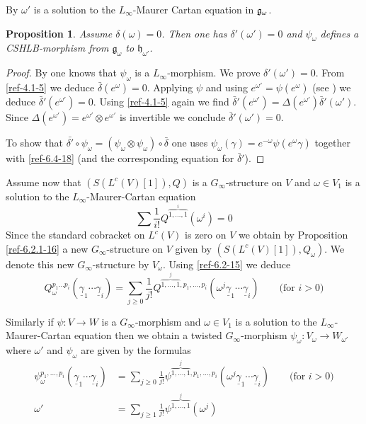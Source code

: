 \documentclass{amsart}
\numberwithin{equation}{section}
\newtheorem{propositions}[lemmas]{Proposition}
\theoremstyle{definition}
\theoremstyle{remark}
\begin{document}
By \cite{ye7} $\omega'$ is a solution to the $L_\infty$-Maurer Cartan
equation in $\frak{g}_\omega$.
\begin{propositions} Assume $\delta(\omega)=0$. Then one has
  $\delta'(\omega')=0$ and $\psi_\omega$ defines a 
  CSHLB-morphism from $\mathfrak{g}_\omega$ to
  $\mathfrak{h}_{\omega'}$.
\end{propositions}
\begin{proof} By \cite{ye7} one knows that $\psi_\omega$ is a
  $L_\infty$-morphism. We prove $\delta'(\omega')=0$.  From
  \eqref{ref-4.1-5} we deduce $\bar{\delta}(e^\omega)=0$. Applying
  $\psi$ and using $e^{\omega'}=\psi(e^{\omega})$ (see \cite{ye7}) we deduce
$\bar{\delta}'(e^{\omega'})=0$. Using \eqref{ref-4.1-5} again we find
$\bar{\delta}'(e^{\omega'})=\Delta(e^{\omega'})\bar{\delta}'(\omega')$. 
Since $\Delta(e^{\omega'})=e^{\omega'}\otimes e^{\omega'}$ is invertible
we conclude $\bar{\delta}'(\omega')=0$. 

To show that
  $\bar{\delta'}\circ\psi_\omega=(\psi_\omega\otimes\psi_\omega)\circ\bar{\delta}$
one uses $\psi_\omega(\gamma)=e^{-\omega}\psi(e^{\omega}\gamma)$ \cite{ye7}
together with \eqref{ref-6.4-18} (and the corresponding equation
for $\bar{\delta}'$).
\end{proof}
Assume now that $(S(L^c(V)[1]),Q)$ is a $G_\infty$-structure on $V$ and 
$\omega\in V_1$ is a solution to the $L_\infty$-Maurer-Cartan equation
\begin{equation}
\label{ref-6.5-19}
\sum \frac{1}{i!}Q^{\overbrace{1,\dots,1}^i}(\omega^i)=0
\end{equation}
Since the standard cobracket on $L^c(V)$ is zero on $V$ we obtain by Proposition
\ref{ref-6.2.1-16} a new
$G_\infty$-structure on $V$ given by $(S(L^c(V)[1]),Q_\omega)$. We denote this
new $G_\infty$-structure by $V_\omega$.  Using \eqref{ref-6.2-15} we deduce
\begin{equation}
\label{ref-6.6-20}
Q_\omega^{p_1\dots p_i}(\underline{\gamma}_1\cdots\underline{\gamma}_i)=
\sum_{j\ge 0}\frac{1}{j!} Q^{\overbrace{1,\dots,1}^j,p_1,\dots,p_i}
(\omega^j\underline{\gamma}_1\cdots\underline{\gamma}_i )\qquad\text{(for $i>0$)}
\end{equation}

Similarly if $\psi:V\rightarrow W$ is a $G_\infty$-morphism and $\omega\in V_1$ is a solution
to the $L_\infty$-Maurer-Cartan equation then we obtain a twisted $G_\infty$-morphism
$\psi_\omega:V_\omega\rightarrow W_{\omega'}$ where $\omega'$ and $\psi_\omega$ are given
by the formulas 
\begin{align}
\label{ref-6.7-21} \psi_{\omega}^{p_1,\dots,p_i}(\underline{\gamma}_1\cdots\underline{\gamma}_i)&=
\sum_{j\ge 0}\frac{1}{j!}\psi^{\overbrace{1,\dots,1}^j,p_1,\dots,p_i}
(\omega^j\underline{\gamma}_1\cdots\underline{\gamma}_i)\qquad \text{(for $i>0$)}\\
\label{ref-6.8-22} \omega'&=\sum_{j\ge 1}\frac{1}{j!}\psi^{\overbrace{1,\dots,1}^j}(\omega^j )
\end{align}
\end{document}
